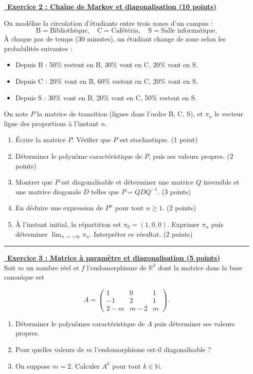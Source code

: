 \underline {\, \bf{Exercice 2 : Chaîne de Markov et diagonalisation } \bf{(10 points)}}
\medskip

On modélise la circulation d'étudiants entre trois zones d'un campus :
\[
\text{B}=\text{Bibliothèque},\quad
\text{C}=\text{Cafétéria},\quad
\text{S}=\text{Salle informatique}.
\]
À chaque pas de temps (30 minutes), un étudiant change de zone selon les probabilités suivantes :
\begin{itemize}
    \item Depuis B : 50\% restent en B, 30\% vont en C, 20\% vont en S.
    \item Depuis C : 20\% vont en B, 60\% restent en C, 20\% vont en S.
    \item Depuis S : 30\% vont en B, 20\% vont en C, 50\% restent en S.
\end{itemize}

On note $P$ la matrice de transition (lignes dans l'ordre B, C, S), et $\pi_n$ le vecteur ligne des proportions à l'instant $n$.

\begin{enumerate}
    \item Écrire la matrice $P$. Vérifier que $P$ est stochastique. (1 point)
    \item Déterminer le polynôme caractéristique de $P$, puis ses valeurs propres. (2 points)
    \item Montrer que $P$ est diagonalisable et déterminer une matrice $Q$ inversible et une matrice diagonale $D$ telles que $P=QDQ^{-1}$. (3 points)
    \item En déduire une expression de $P^n$ pour tout $n\geq 1$. (2 points)
    \item À l'instant initial, la répartition est $\pi_0=(1,0,0)$. Exprimer $\pi_n$ puis déterminer $\displaystyle\lim_{n\to +\infty}\pi_n$. Interpréter ce résultat. (2 points)
\end{enumerate}

\hfill\break
\hrule
\hfill\break


\underline {\, \bf{Exercice 3 : Matrice à paramètre et diagonalisation } \bf{(5 points)}}\\
\medskip
Soit $m$ un nombre réel et $f$ l'endomorphisme de $\mathbb{R}^3$ dont la matrice dans la base canonique est

$$
A=\left(\begin{array}{rcc}
1 & 0 & 1 \\
-1 & 2 & 1 \\
2-m & m-2 & m
\end{array}\right) .
$$

\begin{enumerate}
    \item Déterminer le polynômes caractéristique de $A$ puis déterminer ses valeurs propres.
    \item Pour quelles valeurs de $m$ l'endomorphisme est-il diagonalisable ?
    \item On suppose $m=2$. Calculer $A^k$ pour tout $k \in \mathbb{N}$.
\end{enumerate}


